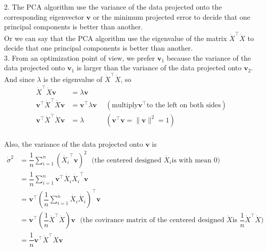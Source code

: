 \documentclass[10pt]{article}
\begin{document}
\begin{enumerate}[1.]
2. The PCA algorithm use the variance of the data projected onto the corresponding eigenvector $\mathbf{v}$ or the minimum projected error to decide that one principal components is better than another.\\
Or we can say that the PCA algorithm use the eigenvalue of the matrix $\dot{X}^{\top} \dot{X}$ to decide that one principal components is better than another.\\

3. From an optimization point of view, we prefer $\mathbf{v}_1$ because the variance of the data projected onto $\mathbf{v}_1$ is larger than the variance of the data projected onto $\mathbf{v}_2$.
And since $\lambda$ is the eigenvalue of $\dot{X}^{\top} \dot{X}$, so 
\begin{equation}
\begin{aligned}
  \dot{X}^{\top} \dot{X}\mathbf{v} &= \lambda\mathbf{v}\\
  \mathbf{v}^{\top}\dot{X}^{\top} \dot{X}\mathbf{v} &= \mathbf{v}^{\top}\lambda\mathbf{v}\ \ &(\text{multiply} \mathbf{v}^{\top} \text{to the left on both sides})\\
  \mathbf{v}^{\top}\dot{X}^{\top} \dot{X}\mathbf{v} &= \lambda\ \ &(\mathbf{v}^{\top}\mathbf{v}=\|\mathbf{v}\|^2=1)\\
\end{aligned}
\end{equation}

Also, the variance of the data projected onto $\mathbf{v}$ is
\begin{equation}
  \begin{aligned}
    \dot{\sigma}^2 &= \dfrac{1}{n}\sum\limits_{i=1}^n (\dot{X_i}^{\top}\mathbf{v})^2 \ \ \ \text{(the centered designed } \dot{X_i} \text{is with mean 0)}\\
                   &= \dfrac{1}{n}\sum\limits_{i=1}^n \mathbf{v}^{\top}\dot{X_i}\dot{X_i}^{\top}\mathbf{v}\\
                   &=  \mathbf{v}^{\top}(\dfrac{1}{n}\sum\limits_{i=1}^n\dot{X_i}\dot{X_i})^{\top}\mathbf{v}\\
                   &= \mathbf{v}^{\top}(\dfrac{1}{n}\dot{X}^{\top}\dot{X})\mathbf{v}\ \ \ \text{(the covirance matrix of the centered designed } \dot{X} \text{is } \dfrac{1}{n}\dot{X}^{\top}\dot{X}\text{)}\\
                   &= \dfrac{1}{n}\mathbf{v}^{\top}\dot{X}^{\top}\dot{X}\mathbf{v}
  \end{aligned}
\end{equation}


\end{enumerate}
\end{document}
